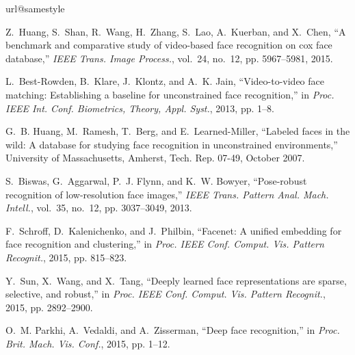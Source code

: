 \documentclass[10pt,journal,cspaper,compsoc]{IEEEtran}
\begin{document}
\begin{thebibliography}{10}
\providecommand{\url}[1]{#1}
\csname url@samestyle\endcsname
\providecommand{\newblock}{\relax}
\providecommand{\bibinfo}[2]{#2}
\providecommand{\BIBentrySTDinterwordspacing}{\spaceskip=0pt\relax}
\providecommand{\BIBentryALTinterwordstretchfactor}{4}
\providecommand{\BIBentryALTinterwordspacing}{\spaceskip=\fontdimen2\font plus
\BIBentryALTinterwordstretchfactor\fontdimen3\font minus
  \fontdimen4\font\relax}
\providecommand{\BIBforeignlanguage}[2]{{%
\expandafter\ifx\csname l@#1\endcsname\relax
\typeout{** WARNING: IEEEtran.bst: No hyphenation pattern has been}%
\typeout{** loaded for the language `#1'. Using the pattern for}%
\typeout{** the default language instead.}%
\else
\language=\csname l@#1\endcsname
\fi
#2}}
\providecommand{\BIBdecl}{\relax}
\BIBdecl

Z.~Huang, S.~Shan, R.~Wang, H.~Zhang, S.~Lao, A.~Kuerban, and X.~Chen, ``A
  benchmark and comparative study of video-based face recognition on cox face
  database,'' \emph{IEEE Trans. Image Process.}, vol.~24, no.~12, pp.
  5967--5981, 2015.

L.~Best-Rowden, B.~Klare, J.~Klontz, and A.~K. Jain, ``Video-to-video face
  matching: Establishing a baseline for unconstrained face recognition,'' in
  \emph{Proc. IEEE Int. Conf. Biometrics, Theory, Appl. Syst.}, 2013, pp. 1--8.

G.~B. Huang, M.~Ramesh, T.~Berg, and E.~Learned-Miller, ``Labeled faces in the
  wild: A database for studying face recognition in unconstrained
  environments,'' University of Massachusetts, Amherst, Tech. Rep. 07-49,
  October 2007.

S.~Biswas, G.~Aggarwal, P.~J. Flynn, and K.~W. Bowyer, ``Pose-robust
  recognition of low-resolution face images,'' \emph{IEEE Trans. Pattern Anal.
  Mach. Intell.}, vol.~35, no.~12, pp. 3037--3049, 2013.

F.~Schroff, D.~Kalenichenko, and J.~Philbin, ``Facenet: A unified embedding for
  face recognition and clustering,'' in \emph{Proc. IEEE Conf. Comput. Vis.
  Pattern Recognit.}, 2015, pp. 815--823.

Y.~Sun, X.~Wang, and X.~Tang, ``Deeply learned face representations are sparse,
  selective, and robust,'' in \emph{Proc. IEEE Conf. Comput. Vis. Pattern
  Recognit.}, 2015, pp. 2892--2900.

O.~M. Parkhi, A.~Vedaldi, and A.~Zisserman, ``Deep face recognition,'' in
  \emph{Proc. Brit. Mach. Vis. Conf.}, 2015, pp. 1--12.


\end{thebibliography}
\end{document}
